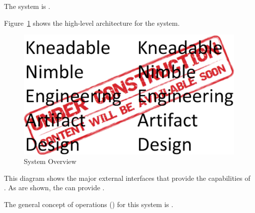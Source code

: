 The \ThisSystem system is \TBD.

Figure~\ref{fig:SystemOverview} shows the high-level architecture for the \ThisSys system. 
\begin{figure}[htbp]
	\centering
		\includegraphics[width=6in]{images/KNEAD_UnderConstruction_100dpi_6.5inchesWide.eps}
		\caption{System Overview}
	\label{fig:SystemOverview}
\end{figure}
This diagram shows the major external interfaces that provide the capabilities of \ThisSys.
As are shown, the \ThisSys can provide \TBD.


The general concept of operations (\CONOP) for this system is \TBD.





